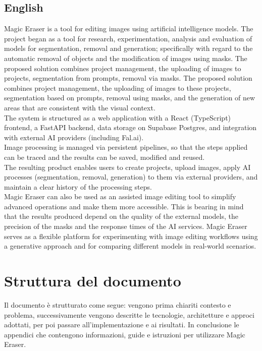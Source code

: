 \documentclass[oneside]{supsistudent}
\begin{document}
\subsection*{English}
Magic Eraser is a tool for editing images using artificial intelligence models.
The project began as a tool for research, experimentation, analysis and evaluation
of models for segmentation, removal and generation; specifically with regard to
the automatic removal of objects and the modification of images using masks.
The proposed solution combines project management, the uploading of images to projects,
segmentation from prompts, removal via masks.
The proposed solution combines project management, the uploading of images to these projects,
segmentation based on prompts, removal using masks, and the generation of new areas
that are consistent with the visual context.\
\\The system is structured as a web application with a React (TypeScript) frontend, a
FastAPI backend, data storage on Supabase Postgres, and integration with external AI providers (including Fal.ai).
\\Image processing is managed via persistent pipelines, so that
the steps applied can be traced and the results can be saved, modified and reused.
\\The resulting product enables users to create projects, upload images,
apply AI processes (segmentation, removal, generation) to them via external providers,
and maintain a clear history of the processing steps.
\\Magic Eraser can also be used as an assisted image editing tool
to simplify advanced operations and make them more accessible. This is bearing in mind
that the results produced depend on the quality of the external models, the precision of the masks
and the response times of the AI services.
Magic Eraser serves as a flexible platform for experimenting with image editing workflows
using a generative approach and for comparing different models in real-world scenarios.

\section*{Struttura del documento}

Il documento è strutturato come segue:
vengono prima chiariti contesto e problema, successivamente vengono
descritte le tecnologie, architetture e approci adottati, per poi passare all'implementazione
e ai risultati.
In conclusione le appendici che contengono informazioni,
guide e istruzioni per utilizzare Magic Eraser.
\end{document}
